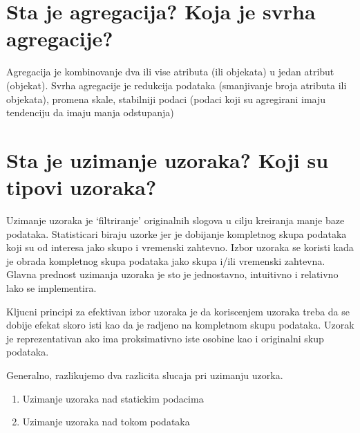 \documentclass[a4paper]{article}
\begin{document}
\section{Sta je agregacija? Koja je svrha agregacije?}
Agregacija je kombinovanje dva ili vise atributa (ili objekata) u jedan atribut (objekat). Svrha
agregacije je redukcija podataka (smanjivanje broja atributa ili objekata), promena skale,
stabilniji podaci (podaci koji su agregirani imaju tendenciju da imaju manja odstupanja)

\section{Sta je uzimanje uzoraka? Koji su tipovi uzoraka?}
Uzimanje uzoraka je `filtriranje' originalnih slogova u cilju kreiranja manje baze podataka.
Statisticari biraju uzorke jer je dobijanje kompletnog skupa podataka koji su od interesa jako skupo
i vremenski zahtevno. Izbor uzoraka se koristi kada je obrada kompletnog skupa podataka jako skupa
i/ili vremenski zahtevna.  Glavna prednost uzimanja uzoraka je sto je jednostavno, intuitivno i
relativno lako se implementira.

Kljucni principi za efektivan izbor uzoraka je da koriscenjem uzoraka treba da se dobije efekat
skoro isti kao da je radjeno na kompletnom skupu podataka. Uzorak je reprezentativan ako ima
proksimativno iste osobine kao i originalni skup podataka.

Generalno, razlikujemo dva razlicita slucaja pri uzimanju uzorka.
\begin{enumerate}
    \item Uzimanje uzoraka nad statickim podacima
    \item Uzimanje uzoraka nad tokom podataka
\end{enumerate}
\end{document}

